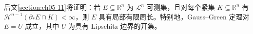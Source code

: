 \documentclass[../../main.tex]{subfiles}%
\begin{document}
\begin{remark}\label{remark:ch05-thm-5-16-判别}
后文\cref{section:ch05-11}将证明：若 $E\subseteq\mathbb{R}^n$ 为 $\mathcal{L}^n$-可测集，且对每个紧集 $K\subseteq\mathbb{R}^n$ 有 $\mathcal{H}^{n-1}(\partial_*E\cap K)<\infty$，则 $E$ 具有局部有限周长。特别地，Gauss--Green 定理对 $E=U$ 成立，其中 $U$ 为具有 Lipschitz 边界的开集。%
\end{remark}
\end{document}
